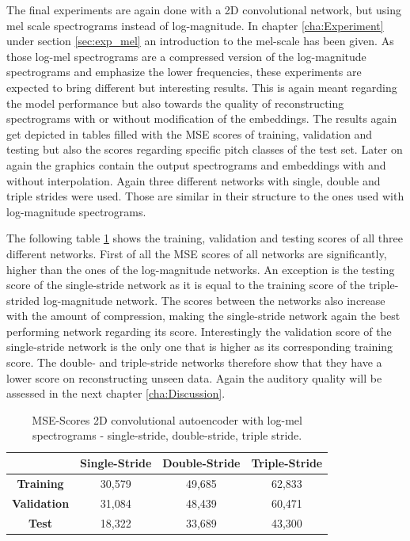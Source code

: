 The final experiments are again done with a 2D convolutional network, but using mel scale spectrograms instead of log-magnitude. In chapter \ref{cha:Experiment} under section \ref{sec:exp_mel} an introduction to the mel-scale has been given. As those log-mel spectrograms are a compressed version of the log-magnitude spectrograms and emphasize the lower frequencies, these experiments are expected to bring different but interesting results. This is again meant regarding the model performance but also towards the quality of reconstructing spectrograms with or without modification of the embeddings. The results again get depicted in tables filled with the MSE scores of training, validation and testing but also the scores regarding specific pitch classes of the test set. Later on again the graphics contain the output spectrograms and embeddings with and without interpolation. Again three different networks with single, double and triple strides were used. Those are similar in their structure to the ones used with log-magnitude spectrograms.

The following table \ref{tab:res_scores_2D_mel} shows the training, validation and testing scores of all three different networks. First of all the MSE scores of all networks are significantly, higher than the ones of the log-magnitude networks. An exception is the testing score of the single-stride network as it is equal to the training score of the triple-strided log-magnitude network. The scores between the networks also increase with the amount of compression, making the single-stride network again the best performing network regarding its score. Interestingly the validation score of the single-stride network is the only one that is higher as its corresponding training score. The double- and triple-stride networks therefore show that they have a lower score on reconstructing unseen data. Again the auditory quality will be assessed in the next chapter \ref{cha:Discussion}.

\begin{table}[htb!]
    \centering
    \captionsetup{justification=centering}
    \begin{tabular}{|c|c|c|c|}
        \hline
         & \textbf{Single-Stride} & \textbf{Double-Stride} & \textbf{Triple-Stride} \\
         \hline
        \textbf{Training} & 30,579 & 49,685 & 62,833 \\
        \hline
        \textbf{Validation} & 31,084 & 48,439 & 60,471\\
        \hline
        \textbf{Test} & 18,322 & 33,689 & 43,300\\
        \hline
    \end{tabular}
    \caption{MSE-Scores 2D convolutional autoencoder with log-mel spectrograms - single-stride, double-stride, triple stride.}
    \label{tab:res_scores_2D_mel}
\end{table}

